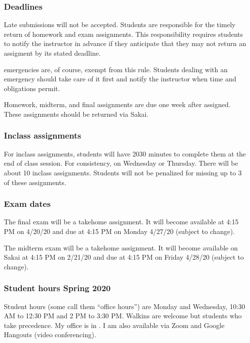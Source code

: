 \documentclass[letterpaper,10pt,english]{sphinxmanual}
\begin{document}
\subsubsection{Deadlines}
\label{\detokenize{COMP163/organization:deadlines}}
Late submissions will not be accepted. Students are responsible for the timely return of homework and exam assignments. This responsibility requires students to notify the instructor in advance if they anticipate that they may not return an assigment by its stated deadline.

 emergencies are, of course, exempt from this rule. Students dealing with an emergency should take care of it first and notify the instructor when time and obligations permit.

Homework, midterm, and final assignments are due one week after assigned. These assignments should be returned via Sakai.


\subsubsection{In\sphinxhyphen{}class assignments}
\label{\detokenize{COMP163/organization:in-class-assignments}}
For in\sphinxhyphen{}class assignments, students will have 20\sphinxhyphen{}30 minutes to complete them at the end of class session. For consistency,  on Wednesday or Thursday. There will be about 10 in\sphinxhyphen{}class assignments. Students will not be penalized for missing up to 3 of these assignments.


\subsubsection{Exam dates}
\label{\detokenize{COMP163/organization:exam-dates}}
The final exam will be a take\sphinxhyphen{}home assignment. It will become available at 4:15 PM on 4/20/20 and due at 4:15 PM on Monday 4/27/20 (subject to change).

The midterm exam will be a take\sphinxhyphen{}home assignment. It will become available on Sakai at 4:15 PM on 2/21/20 and due at 4:15 PM on Friday 4/28/20 (subject to change).


\subsubsection{Student hours \sphinxhyphen{} Spring 2020}
\label{\detokenize{COMP163/organization:student-hours-spring-2020}}
Student hours (some call them “office hours”) are Monday and Wednesday, 10:30 AM to 12:30 PM and 2 PM to 3:30 PM. Walk\sphinxhyphen{}ins are welcome but students who   take precedence. My office is in . I am also available via Zoom and Google Hangouts (video conferencing).
\end{document}
